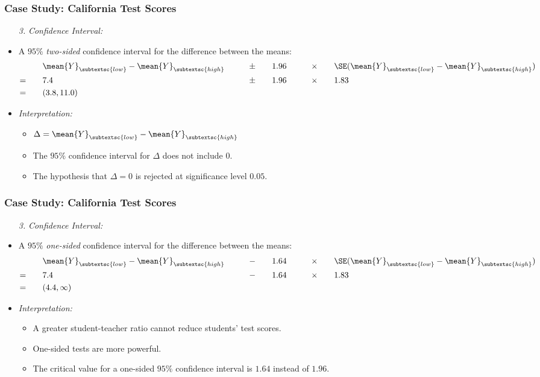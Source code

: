 \begin{frame}
\frametitle{Case Study: California Test Scores}
\begin{itemize}
\item[\emph{3.}] \emph{Confidence Interval:} 
\item A $95\%$ \emph{two-sided} confidence interval for the difference between the means:
\begin{alignat*}{3}
& \mean{Y}_{\subtextsc{low}}-\mean{Y}_{\subtextsc{high}} 
  \qquad&\pm\qquad&
    1.96 \qquad&\times\qquad& \SE(\mean{Y}_{\subtextsc{low}}-\mean{Y}_{\subtextsc{high}})\\
= \qquad& 7.4 
  \qquad&\pm\qquad& 
    1.96 \qquad&\times\qquad& 1.83 \\
= \qquad& (3.8,11.0) \qquad&
\end{alignat*}
\item \emph{Interpretation:}
\begin{itemize}
\item $\Delta = \mean{Y}_{\subtextsc{low}}-\mean{Y}_{\subtextsc{high}}$ 
\item The $95\%$ confidence interval for $\Delta$ does not include $0$.
\item The hypothesis that $\Delta=0$ is rejected at significance level $0.05$. 
\end{itemize}
\end{itemize}
\end{frame}


\begin{frame}
\frametitle{Case Study: California Test Scores}
\begin{itemize}
\item[\emph{3.}] \emph{Confidence Interval:} 
\item A $95\%$ \emph{one-sided} confidence interval for the difference between the means:
\begin{alignat*}{3}
& \mean{Y}_{\subtextsc{low}}-\mean{Y}_{\subtextsc{high}} 
  \qquad&-\qquad&
    1.64 \qquad&\times\qquad& \SE(\mean{Y}_{\subtextsc{low}}-\mean{Y}_{\subtextsc{high}})\\
= \qquad& 7.4 
  \qquad&-\qquad& 
    1.64 \qquad&\times\qquad& 1.83 \\
= \qquad& (4.4, \infty) \qquad& 
\end{alignat*}
\item \emph{Interpretation:}
\begin{itemize}
\item A greater student-teacher ratio cannot reduce students' test scores.
\item One-sided tests are more powerful.
\item The critical value for a one-sided $95\%$ confidence interval is $1.64$ instead of $1.96$.
\end{itemize}
\end{itemize}
\end{frame}



